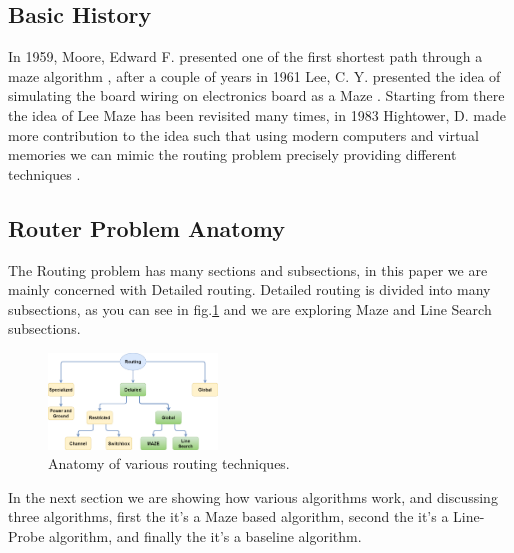 \subsection{Basic History}
    In 1959, Moore, Edward F. presented one of the first shortest path through a maze algorithm
    \cite{MooreRef}, after a couple of years in 1961 Lee, C. Y. presented the idea of simulating the 
    board wiring on electronics board as a Maze \cite{LeeRef}. Starting from there the idea of Lee Maze
    has been revisited many times, in 1983 Hightower, D. made more contribution to the idea such that
    using modern computers and virtual memories we can mimic the routing problem precisely providing 
    different techniques \cite{HightowerRef}.

\subsection{Router Problem Anatomy}
    The Routing problem has many sections and subsections, in this paper we are mainly concerned with
    Detailed routing. Detailed routing is divided into many subsections, as you can see in fig.\ref{fig:routing_anat} 
    and we are exploring Maze and Line Search subsections.

    \begin{figure}[H]
        \centering
        \includegraphics[width=0.4\textwidth]{figures/routing_anatomy.png}
        \caption{Anatomy of various routing techniques.}
        \label{fig:routing_anat}
    \end{figure}

    In the next section we are showing how various algorithms work, and discussing three 
    algorithms, first the  it's a Maze based algorithm, second the 
     it's a Line-Probe algorithm, and finally the  
    it's a baseline algorithm.

